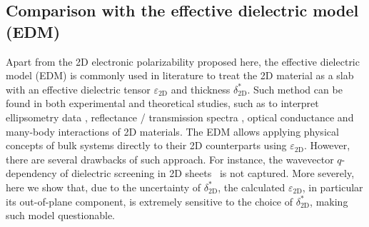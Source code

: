 \documentclass[journal=ancac3,manuscript=article,email=true,hyperref=true,keywords=false]{achemso}
\begin{document}
\subsection{Comparison with the effective dielectric model (EDM)}
\label{sec:comp-with-effect}

Apart from the 2D electronic polarizability proposed here,  
the effective dielectric model (EDM) is commonly used in
literature to treat the 2D material as a slab with an effective
dielectric tensor $\varepsilon_{\mathrm{2D}}$ and thickness
$\delta^{*}_{\mathrm{2D}}$. Such method can be found in both
experimental and theoretical studies, such as to interpret
ellipsometry data
\cite{graphene-epsilon10,Duesberg14,Chiang13,Kong14}, reflectance /
transmission spectra \cite{Li_2014, Yoffe-Wilson69}, optical
conductance \cite{Matthes_2016} and many-body interactions
\cite{Sohier_2016,Meckbach_2018} of 2D materials. The EDM allows
applying physical concepts of bulk systems directly to their 2D counterparts using
$\varepsilon_{\mathrm{2D}}$. However, there are several drawbacks of
such approach. For instance, the wavevector $q$-dependency of
dielectric screening in 2D
sheets~\cite{Cudazzo_2011_screening_2D,Olsen_2016_hydrogen,Trolle_2017_eps_subst}
is not captured. More severely, here we show that, due to the
uncertainty of $\delta^{*}_{\mathrm{2D}}$, the calculated
$\varepsilon_{\mathrm{2D}}$, in particular its out-of-plane component,
is extremely sensitive to the choice of $\delta^{*}_{\mathrm{2D}}$,
making such model questionable.
\end{document}
